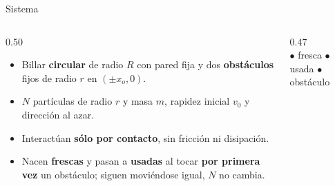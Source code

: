 \documentclass[aspectratio=169,11pt]{beamer}
\begin{document}
\begin{frame}{Sistema}
    \begin{columns}[c,onlytextwidth]
        \begin{column}{0.50\textwidth}
            \large
            \begin{itemize}\setlength{\itemsep}{1.0em}
                \item Billar \textbf{circular} de radio $R$ con pared fija y dos
                      \textbf{obstáculos} fijos de radio $r$ en $(\pm x_o, 0)$.
                \item $N$ partículas de radio $r$ y masa $m$, rapidez inicial $v_0$
                      y dirección al azar.
                \item Interactúan \textbf{sólo por contacto}, sin fricción ni
                      disipación.
                \item Nacen \textcolor{fresca}{\textbf{frescas}} y pasan a
                      \textcolor{usada}{\textbf{usadas}} al tocar \textbf{por primera
                      vez} un obstáculo; siguen moviéndose igual, $N$ no cambia.
            \end{itemize}
        \end{column}\hfill
        \begin{column}{0.47\textwidth}
            \centering
            \\[0.4em]
            {\footnotesize\color{gris}
             \textcolor{fresca}{$\bullet$} fresca \quad
             \textcolor{usada}{$\bullet$} usada \quad
             \textcolor{obstaculo}{$\bullet$} obstáculo}
        \end{column}
    \end{columns}
\end{frame}
\end{document}
